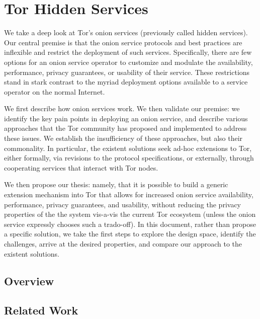 \section{Tor Hidden Services}
\label{sec:tor}

We take a deep look at Tor's onion services (previously called hidden
services).  
%
Our central premise is that the onion service protocols and
best practices are inflexible and restrict the deployment of such services.
%
Specifically, there are few options for an onion service operator to customize
and modulate the availability, performance, privacy guarantees, or usability of
their service.
%
These restrictions stand in stark contrast to the myriad deployment options
available to a service operator on the normal Internet.


We first describe how onion services work.
%
We then validate our premise: we identify the key pain points in deploying an
onion service, and describe various approaches that the Tor community has
proposed and implemented to address these issues.
%
We establish the insufficiency of these approaches, but also their commonality.
In particular, the existent solutions seek ad-hoc extensions to Tor, either
formally, via revisions to the protocol specifications, or externally, through
cooperating services that interact with Tor nodes.


We then propose our thesis: namely, that it is possible to build a generic extension
mechanism into Tor that allows for increased onion service availability,
performance, privacy guarantees, and usability, without reducing the privacy
properties of the the system vis-a-vis the current Tor ecosystem (unless the
onion service expressly chooses such a trado-off).
%
In this document, rather than propose a specific solution, we take the first
steps to explore the design space, identify the challenges, arrive at the
desired properties, and compare our approach to the existent solutions.



\subsection{Overview}


\subsection{Related Work}

